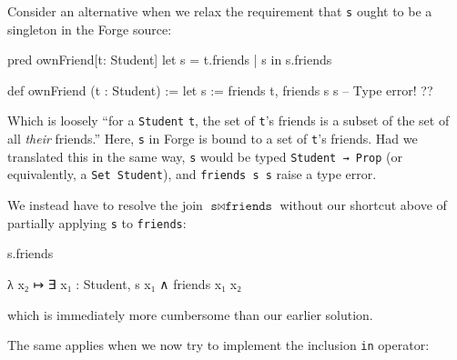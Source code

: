 Consider an alternative when we relax the requirement that \texttt{s} ought to be a singleton in the Forge source: 

\vspace{0.5em}
\noindent\begin{minipage}{0.5\textwidth}
\begin{forge*}
pred ownFriend[t: Student] {
  let s = t.friends |
    s in s.friends
}
\end{forge*}
\end{minipage}%
\begin{minipage}{0.5\textwidth}
\begin{lean*}
def ownFriend (t : Student) := 
  let s := friends t, 
    friends s s -- Type error!
?\phantom{}?
\end{lean*}
\end{minipage}
\vspace{0.5em}\newline
Which is loosely ``for a \texttt{Student} \texttt{t}, the set of \texttt{t}'s friends is a subset of the set of all \emph{their} friends.'' Here, \texttt{s} in Forge is bound to a set of \texttt{t}'s friends. Had we translated this in the same way, \texttt{s} would be typed \texttt{Student → Prop} (or equivalently, a \texttt{Set Student}), and \texttt{friends s s} raise a type error. 

We instead have to resolve the join $\texttt{s} \bowtie \texttt{friends}$ without our shortcut above of partially applying \texttt{s} to \texttt{friends}: 

\vspace{0.5em}
\noindent\begin{minipage}{0.3\textwidth}
\begin{forge*}
s.friends
\end{forge*}
\end{minipage}%
\begin{minipage}{0.7\textwidth}
\begin{lean*}
λ x₂ ↦ ∃ x₁ : Student, s x₁ ∧ friends x₁ x₂
\end{lean*}
\end{minipage}
\vspace{0.5em}\newline
which is immediately more cumbersome than our earlier solution. 

\newpage
The same applies when we now try to implement the inclusion \texttt{in} operator: 

